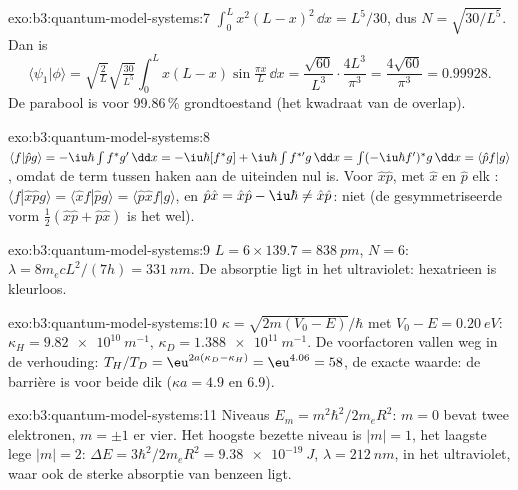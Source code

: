 \begin{solution}{exo:b3:quantum-model-systems:7}
$\int_0^Lx^2(L - x)^2\,\dd x = L^5/30$, dus $N = \sqrt{30/L^5}$. Dan is
\[
\langle\psi_1|\phi\rangle = \sqrt{\tfrac2L}\sqrt{\tfrac{30}{L^5}}\int_0^Lx(L -
x)\sin\tfrac{\pi x}{L}\,\dd x = \frac{\sqrt{60}}{L^3}\cdot\frac{4L^3}{\pi^3} =
\frac{4\sqrt{60}}{\pi^3} = 0.99928 .
\]
De parabool is voor 99.86\,\% grondtoestand (het kwadraat van de overlap).
\end{solution}

\begin{solution}{exo:b3:quantum-model-systems:8}
$\langle f|\hat pg\rangle = -\iu\hbar\int f^*g'\,\dd x = -\iu\hbar[f^*g] +
\iu\hbar\int f^{*\prime}g\,\dd x = \int(-\iu\hbar f')^*g\,\dd x = \langle\hat
pf|g\rangle$, omdat de term tussen haken aan de uiteinden nul is. Voor $\hat x\hat p$, met $\hat x$ en $\hat p$ elk :
$\langle f|\hat x\hat pg\rangle = \langle\hat xf|\hat pg\rangle = \langle\hat p\hat
xf|g\rangle$, en $\hat p\hat x = \hat x\hat p - \iu\hbar \ne \hat x\hat p$: niet
 (de gesymmetriseerde vorm $\frac12(\hat x\hat p + \hat p\hat x)$ is
het wel).
\end{solution}

\begin{solution}{exo:b3:quantum-model-systems:9}
$L = 6 \times 139.7 = \qty{838}{pm}$, $N = 6$: $\lambda = 8m_ecL^2/(7h) =
\qty{331}{nm}$. De absorptie ligt in het ultraviolet: hexatrieen is
kleurloos.
\end{solution}

\begin{solution}{exo:b3:quantum-model-systems:10}
$\kappa = \sqrt{2m(V_0 - E)}/\hbar$ met $V_0 - E = \qty{0.20}{eV}$:
$\kappa_H = \qty{9.82e10}{m^{-1}}$, $\kappa_D = \qty{1.388e11}{m^{-1}}$. De
voorfactoren vallen weg in de verhouding: $T_H/T_D = \eu^{2a(\kappa_D - \kappa_H)} =
\eu^{4.06} = 58$, de exacte waarde: de barrière is voor beide dik
($\kappa a = 4.9$ en 6.9).
\end{solution}

\begin{solution}{exo:b3:quantum-model-systems:11}
Niveaus $E_m = m^2\hbar^2/2m_eR^2$: $m = 0$ bevat twee elektronen, $m = \pm1$
er vier. Het hoogste bezette niveau is $|m| = 1$, het laagste lege $|m| = 2$: $\Delta E =
3\hbar^2/2m_eR^2 = \qty{9.38e-19}{J}$, $\lambda = \qty{212}{nm}$, in het
ultraviolet, waar ook de sterke absorptie van benzeen ligt.
\end{solution}

